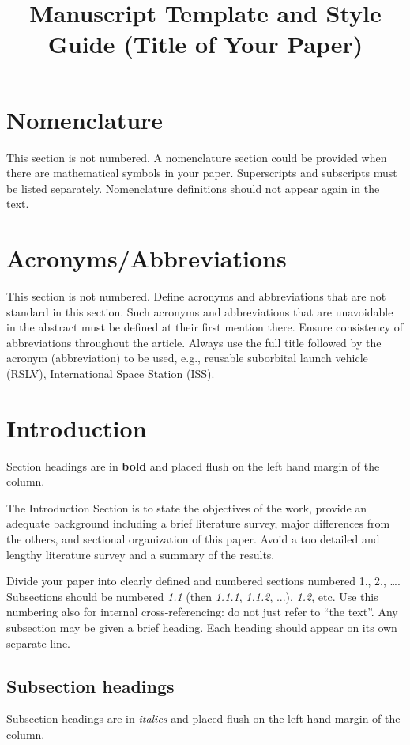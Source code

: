 \documentclass[]{iac}
\title{Manuscript Template and Style Guide (Title of Your Paper)}
\begin{document}
\maketitle



\section*{Nomenclature}
This section is not numbered. A nomenclature section could be provided when there are mathematical symbols in your paper. Superscripts and subscripts must be listed separately. Nomenclature definitions should not appear again in the text.



\section*{Acronyms/Abbreviations}
This section is not numbered. Define acronyms and abbreviations that are not standard in this section. Such acronyms and abbreviations that are unavoidable in the abstract must be defined at their first mention there. Ensure consistency of abbreviations throughout the article. Always use the full title followed by the acronym (abbreviation) to be used, e.g., reusable suborbital launch vehicle (RSLV), International Space Station (ISS).



\section{Introduction}
Section headings are in \textbf{bold} and placed flush on the left hand margin of the column.

The Introduction Section is to state the objectives of the work, provide an adequate background including a brief literature survey, major differences from the others, and sectional organization of this paper. Avoid a too detailed and lengthy literature survey and a summary of the results.

Divide your paper into clearly defined and numbered sections numbered 1., 2., …. Subsections should be numbered \textit{1.1} (then \textit{1.1.1}, \textit{1.1.2}, ...), \textit{1.2}, etc. Use this numbering also for internal cross-referencing: do not just refer to ``the text''. Any subsection may be given a brief heading. Each heading should appear on its own separate line.

\subsection{Subsection headings}
Subsection headings are in \textit{italics} and placed flush on the left hand margin of the column.
\end{document}
